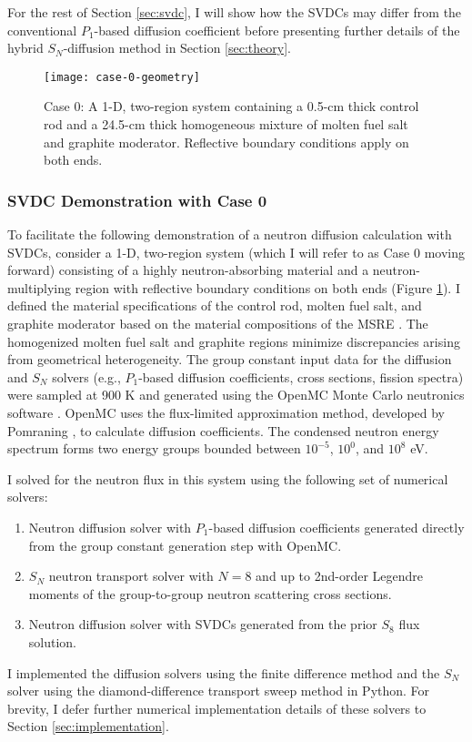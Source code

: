 For the rest of Section \ref{sec:svdc}, I will show how the \glspl{SVDC} may differ from the
conventional $P_1$-based diffusion coefficient before presenting further details of the hybrid
$S_N$-diffusion method in Section \ref{sec:theory}.

\begin{figure}[htb!]
  \centering
  \texttt{[image: case-0-geometry]}
  \caption{Case 0: A 1-D, two-region system containing a 0.5-cm thick control rod and a 24.5-cm
    thick homogeneous mixture of molten fuel salt and graphite moderator. Reflective boundary
    conditions apply on both ends.}
  \label{fig:case-0-geom}
\end{figure}

\subsubsection{\gls{SVDC} Demonstration with Case 0}

To facilitate the following demonstration of a neutron diffusion calculation with \glspl{SVDC},
consider a 1-D, two-region system (which I will refer to as Case 0 moving forward) consisting of a
highly neutron-absorbing material and a
neutron-multiplying region with reflective boundary conditions on both ends (Figure
\ref{fig:case-0-geom}). I defined the material specifications of the control rod, molten fuel salt,
and graphite moderator based on the material compositions of the \gls{MSRE}
\cite{robertson_msre_1965}. The
homogenized molten fuel salt and graphite regions minimize discrepancies arising from geometrical
heterogeneity. The group constant input data for the diffusion and $S_N$ solvers (e.g., $P_1$-based
diffusion coefficients, cross sections, fission spectra) were sampled at 900 K and generated using
the OpenMC Monte Carlo neutronics software \cite{romano_openmc:_2015}. OpenMC uses the flux-limited
approximation method, developed by Pomraning \cite{pomraning_flux-limited_1984}, to calculate
diffusion coefficients. The condensed
neutron energy spectrum forms two energy groups bounded between $10^{-5}$, $10^0$, and $10^8$ eV.

I solved for the neutron flux in this system using the following set of numerical solvers:
%
\begin{enumerate}
  \item Neutron diffusion solver with $P_1$-based diffusion coefficients generated directly from
    the group constant generation step with OpenMC.
  \item $S_N$ neutron transport solver with $N=8$ and up to 2nd-order Legendre
    moments of the group-to-group neutron scattering cross sections.
  \item Neutron diffusion solver with \glspl{SVDC} generated from the prior $S_8$
    flux solution.
\end{enumerate}
%
I implemented the diffusion solvers using the finite difference method and the $S_N$
solver using the diamond-difference transport sweep method in Python. For
brevity, I defer further numerical implementation details of these solvers to Section
\ref{sec:implementation}.

